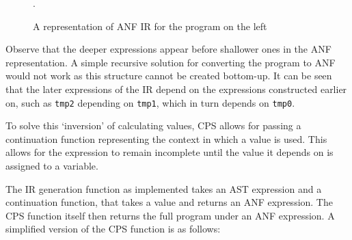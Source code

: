 \begin{figure}[h]
    \begin{center}
    \end{center}
    \caption{A representation of ANF IR for the program on the left}.
\end{figure}

Observe that the deeper expressions appear before shallower ones in the ANF
representation. A simple recursive solution for converting the program to ANF would not work as this
structure cannot be created bottom-up. It can be seen that the later expressions of the IR depend on
the expressions constructed earlier on, such as \texttt{tmp2} depending on \texttt{tmp1}, which in
turn depends on \texttt{tmp0}.

To solve this `inversion' of calculating values, CPS allows for passing a continuation function
representing the context in which a value is used. This allows for the expression to remain
incomplete until the value it depends on is assigned to a variable.

The IR generation function as implemented takes an AST expression and a continuation function, that
takes a value and returns an ANF expression. The CPS function itself then returns the full program
under an ANF expression. A simplified version of the CPS function is as follows:

